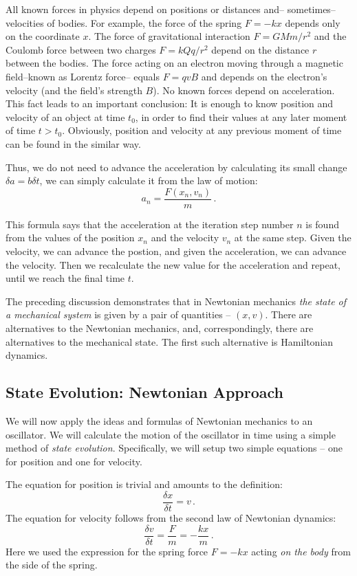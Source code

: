 All known forces in physics depend on positions or distances and--
sometimes-- velocities of bodies. For example, the force of the spring $F=-kx$
depends only on the coordinate $x$. The force of gravitational interaction $F=GMm/r^2$
and the Coulomb force between two charges $F=kQq/r^2$ depend on the distance
$r$ between the bodies. The force acting on an electron moving through
a magnetic field--known as Lorentz force-- equals $F=qvB$ and 
depends on the electron's velocity (and the field's strength $B$). 
No known forces depend on acceleration. This fact leads to an important conclusion:
It is enough to know position and velocity of an object at time $t_{0}$,
in order to find their values at any later moment of time $t>t_{0}$.
Obviously, position and velocity at any previous moment of time can
be found in the similar way.

Thus, we do not need to advance the acceleration by calculating its
small change $\delta a=b\delta t$, we can simply calculate it from
the law of motion:
\begin{equation}
	a_{n}=\frac{F(x_{n},v_{n})}{m}\,.
\end{equation}

This formula says that the acceleration at the iteration step number
$n$ is found from the values of the position $x_{n}$ and the velocity
$v_{n}$ at the same step. Given the velocity, we can advance the
postion, and given the acceleration, we can advance the velocity.
Then we recalculate the new value for the acceleration and repeat,
until we reach the final time $t$.

The preceding discussion demonstrates that in Newtonian mechanics
\emph{the state of a mechanical system} is given by a pair of quantities
-- $(x,v)$. There are alternatives to the Newtonian mechanics, and,
correspondingly, there are alternatives to the mechanical state. The
first such alternative is Hamiltonian dynamics.

\subsection{State Evolution: Newtonian Approach}
We will now apply the ideas and formulas of Newtonian mechanics to an
oscillator. We will calculate the motion of the oscillator in time
using a simple method of \emph{state evolution}. Specifically, we will
setup two simple equations -- one for position and one for velocity.

The equation for position is trivial and amounts to the definition:
\[
\frac{\delta x}{\delta t} = v\,.
\]
The equation for velocity follows from the second law of Newtonian
dynamics:
\[
\frac{\delta v}{\delta t} = \frac{F}{m} = -\frac{kx}{m}\,.
\]
Here we used the expression for the spring force $F=-kx$ acting
\emph{on the body} from the side of the spring.

